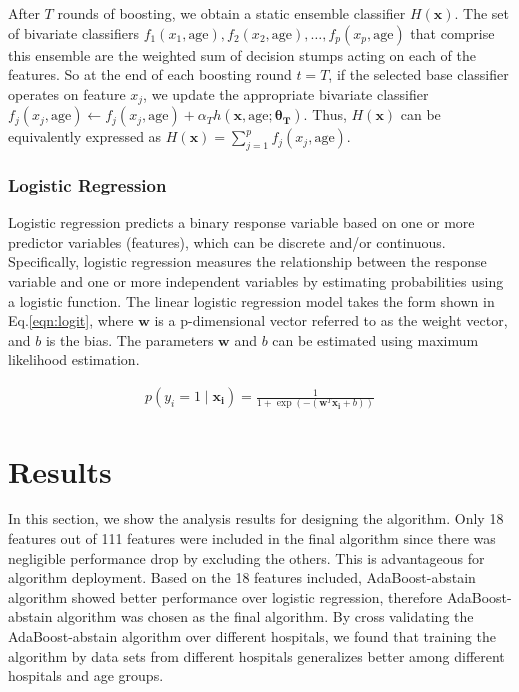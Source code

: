\documentclass[
   technote
]{phildoc}
\newcommand{\eq}{Eq.}
\begin{document}
After $T$ rounds of boosting, we obtain a static ensemble classifier $H(\bm{x})$.  The set of bivariate classifiers $f_1(x_1,\text{age}),f_2(x_2,\text{age}),\dots,f_p(x_p,\text{age})$ that comprise this ensemble are the weighted sum of decision stumps acting on each of the features. So at the end of each boosting round $t=T$, if the selected base classifier operates on feature $x_j$, we update the appropriate bivariate classifier $f_j(x_j,\text{age}) \gets f_j(x_j,\text{age}) + \alpha_T h(\bm{x},\text{age};\bm{\theta_T})$.  Thus, $H(\bm{x})$ can be equivalently expressed as $H(\bm{x})=\sum_{j=1}^p f_j(x_j,\text{age})$. 


\subsection{Logistic Regression}
\label{sec:logreg}
Logistic regression predicts a binary response variable based on one or more predictor variables (features), which can be discrete and/or continuous. Specifically, logistic regression measures the relationship between the response variable and one or more independent variables by estimating probabilities using a logistic function. The linear logistic regression model takes the form shown in \eq{}\ref{eqn:logit}, where $\bm{w}$ is a p-dimensional vector referred to as the weight vector, and $b$ is the bias. The parameters $\bm{w}$ and $b$ can be estimated using maximum likelihood estimation.

\begin{eqnarray}
p(y_{i}=1 \mid \bm{x_{i}})=\frac{1}{1+\exp\left(-\left(\bm{w}^{T}\bm{x_{i}}+b\right)\right)} \label{eqn:logit}
\end{eqnarray}

\chapter{Results}
In this section, we show the analysis results for designing the algorithm. Only 18 features out of 111 features were included in the final algorithm since there was negligible performance drop by excluding the others. This is advantageous for algorithm deployment. Based on the 18 features included, AdaBoost-abstain algorithm showed better performance over logistic regression, therefore AdaBoost-abstain algorithm was chosen as the final algorithm. By cross validating the AdaBoost-abstain algorithm over different hospitals, we found that training the algorithm by data sets from different hospitals generalizes better among different hospitals and age groups.
\end{document}
